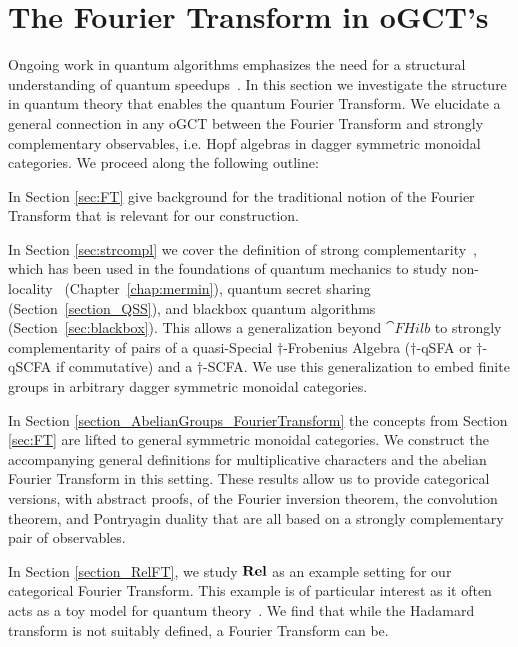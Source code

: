 \section{The Fourier Transform in oGCT's}
\label{sec:strcomplFT}

Ongoing work in quantum algorithms emphasizes the need for a structural understanding of quantum speedups~\cite{aaronson2014need}. In this section we investigate the structure in quantum theory that enables the quantum Fourier Transform. We elucidate a general connection in any oGCT between the Fourier Transform and strongly complementary observables, i.e. Hopf algebras in dagger symmetric monoidal categories. We proceed along the following outline:

In Section \ref{sec:FT} give background for the traditional notion of the Fourier Transform that is relevant for our construction.  

In Section \ref{sec:strcompl} we cover the definition of strong complementarity~\cite{coecke2011interacting}, which has been used in the foundations of quantum mechanics to study non-locality~\cite{coecke2012strong, gogioso2015mermin} (Chapter~\ref{chap:mermin}), quantum secret sharing~\cite{gogioso2015mermin, zamdzhiev2012abstract} (Section~\ref{section_QSS}), and blackbox quantum algorithms~\cite{vicary-tqa, zeng2014abstract, zeng2015models} (Section~\ref{sec:blackbox}). This allows a generalization beyond $\cat{FHilb}$ to strongly complementarity of pairs of a quasi-Special $\dagger$-Frobenius Algebra ($\dagger$-qSFA or $\dagger$-qSCFA if commutative) and a $\dagger$-SCFA. We use this generalization to embed finite groups in arbitrary dagger symmetric monoidal categories.

In Section \ref{section_AbelianGroups_FourierTransform} the concepts from Section \ref{sec:FT} are lifted to general symmetric monoidal categories. We construct the accompanying general definitions for multiplicative characters and the abelian Fourier Transform in this setting.  These results allow us to provide categorical versions, with abstract proofs, of the Fourier inversion theorem, the convolution theorem, and Pontryagin duality that are all based on a strongly complementary pair of observables.

In Section \ref{section_RelFT}, we study $\mathbf{Rel}$ as an example setting for our categorical Fourier Transform. This example is of particular interest as it often acts as a toy model for quantum theory~\cite{evans2009classifying, cqm-notes, pavlovic2009quantum, zeng2015models}.  We find that while the Hadamard transform is not suitably defined, a Fourier Transform can be.

